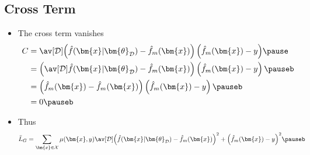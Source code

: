 \begin{slide}
\section{Cross Term}

\begin{PauseHighLight}
  \begin{itemize}
  \item The cross term vanishes
  \begin{align*}
  C &= \av[\mathcal{D}]{ \left(\hat{f}(\bm{x}\vert \bm{\theta}_{\mathcal{D}}) -
              \hat{f}_m(\bm{x}) \right)\left(
              \hat{f}_m(\bm{x}) - y \right) }\pause\\
     &= \left(\av[\mathcal{D}]{\hat{f}(\bm{x}\vert \bm{\theta}_{\mathcal{D}})} -
              \hat{f}_m(\bm{x}) \right)\left(
              \hat{f}_m(\bm{x}) - y \right)\pauseb\\
     &= \left(\hat{f}_m(\bm{x}) -
              \hat{f}_m(\bm{x}) \right)\left(
              \hat{f}_m(\bm{x}) - y \right)\pauseb\\
              &= 0\pauseb
  \end{align*}
  \item Thus
  \begin{align*}
   \bar{L}_G &= \sum_{\bm{x}\in\mathcal{X}} \mu(\bm{x},y)
              \av[\mathcal{D}]{ 
              \left(\hat{f}(\bm{x}\vert \bm{\theta}_{\mathcal{D}}) -
              \hat{f}_m(\bm{x}) \right)^2 + \left(
              \hat{f}_m(\bm{x}) - y \right)^2 }\pauseb
  \end{align*}
  \end{itemize}
\end{PauseHighLight}

\end{slide}




